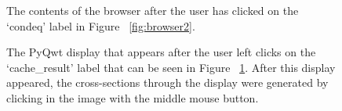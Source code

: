 \documentclass[10pt]{article}
\begin{document}
\begin{figure}
{\par\centering
{}
\par}
\caption {The contents of the browser after the user has clicked on the
`condeq' label in Figure ~\ref{fig:browser2}. }
\label{fig:browser3}
\end{figure}

\begin{figure}
{\par\centering
{}
\par}
\caption {The PyQwt display that appears after the user
left clicks on the `cache\_result' label that can be seen in
Figure ~\ref{fig:browser3}. After this display appeared, the
cross-sections through the display were generated by clicking
in the image with the middle mouse button.}
\label{fig:vells_0}
\end{figure}
\end{document}
